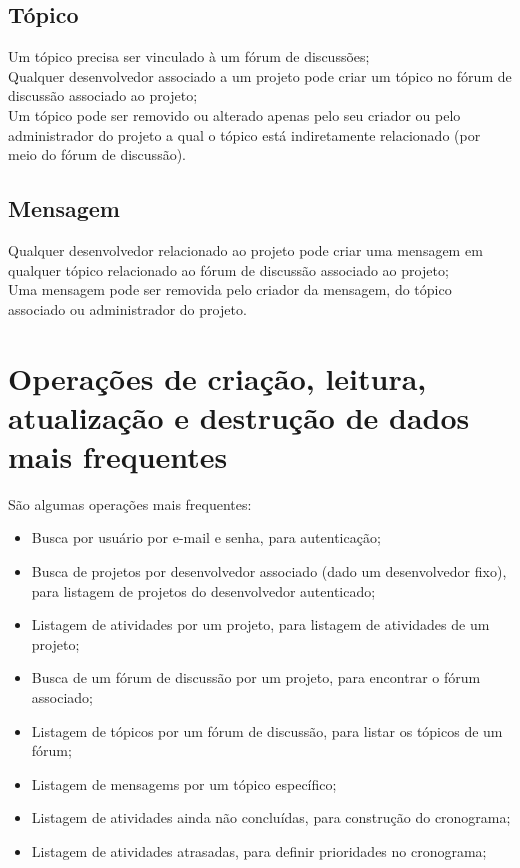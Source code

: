 \documentclass{article}
\begin{document}
	\subsection{Tópico}
	Um tópico precisa ser vinculado à um fórum de discussões;\\
	Qualquer desenvolvedor associado a um projeto pode criar um tópico no fórum de discussão associado ao projeto;\\
	Um tópico pode ser removido ou alterado apenas pelo seu criador ou pelo administrador do projeto a qual o tópico está indiretamente relacionado (por meio do fórum de discussão).

	\subsection{Mensagem}
	Qualquer desenvolvedor relacionado ao projeto pode criar uma mensagem em qualquer tópico relacionado ao fórum de discussão associado ao projeto;\\
	Uma mensagem pode ser removida pelo criador da mensagem, do tópico associado ou administrador do projeto.


\section{Operações de criação, leitura, atualização e destrução de dados mais frequentes}

	São algumas operações mais frequentes:
	
	\begin{itemize}
		\item Busca por usuário por e-mail e senha, para autenticação;
		\item Busca de projetos por desenvolvedor associado (dado um desenvolvedor fixo), para listagem de projetos do desenvolvedor autenticado;
		\item Listagem de atividades por um projeto, para listagem de atividades de um projeto;
		\item Busca de um fórum de discussão por um projeto, para encontrar o fórum associado;
		\item Listagem de tópicos por um fórum de discussão, para listar os tópicos de um fórum;
		\item Listagem de mensagems por um tópico específico;
		\item Listagem de atividades ainda não concluídas, para construção do cronograma;
		\item Listagem de atividades atrasadas, para definir prioridades no cronograma;
	\end{itemize}
\end{document}
